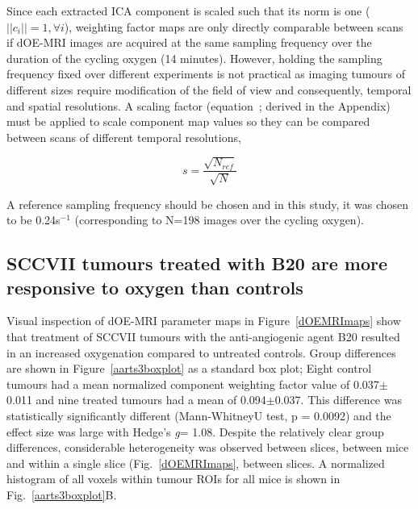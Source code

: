 \documentclass[num-refs]{wiley-article}
\begin{document}
Since each extracted ICA component is scaled such that its norm is one ($||c_i||=1, \forall i $), weighting factor maps are only directly comparable between scans if dOE-MRI images are acquired at the same sampling frequency over the duration of the cycling oxygen (14 minutes).
However, holding the sampling frequency fixed over different experiments is not practical as imaging tumours of different sizes require modification of the field of view and consequently, temporal and spatial resolutions.
A scaling factor (equation~\label{correctionfactor}; derived in the Appendix) must be applied to scale component map values so they can be compared between scans of different temporal resolutions,

\begin{equation}
s = \frac{\sqrt{N_{ref}}}{\sqrt{N}}
\label{correctionfactor}
\end{equation}

A reference sampling frequency should be chosen and in this study, it was chosen to be 0.24s$^{-1}$ (corresponding to N=198 images over the cycling oxygen).


\subsection{SCCVII tumours treated with B20 are more responsive to oxygen than controls}

Visual inspection of dOE-MRI parameter maps in Figure~\ref{dOEMRImaps} show that treatment of SCCVII tumours with the anti-angiogenic agent B20 resulted in an increased oxygenation compared to untreated controls.
Group differences are shown in Figure~\ref{aarts3boxplot} as a standard box plot; Eight control tumours had a mean normalized component weighting factor value of 0.037$\pm$0.011 and nine treated tumours had a mean of 0.094$\pm$0.037.
This difference was statistically significantly different (Mann-WhitneyU test, p = 0.0092) and the effect size was large with Hedge's \emph{g}= 1.08.
Despite the relatively clear group differences, considerable heterogeneity was observed between slices, between mice and within a single slice (Fig.~\ref{dOEMRImaps}, between slices.
A normalized~ histogram of all voxels within tumour ROIs for all mice is shown in Fig.~\ref{aarts3boxplot}B.
\end{document}

